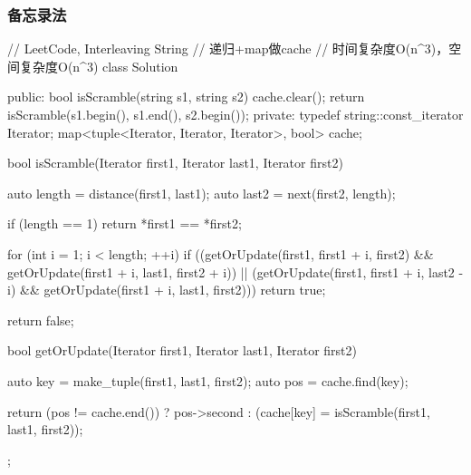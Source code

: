 \subsubsection{备忘录法}
\begin{Code}
// LeetCode, Interleaving String
// 递归+map做cache
// 时间复杂度O(n^3)，空间复杂度O(n^3)
class Solution {
public:
    bool isScramble(string s1, string s2) {
        cache.clear();
        return isScramble(s1.begin(), s1.end(), s2.begin());
    }
private:
    typedef string::const_iterator Iterator;
    map<tuple<Iterator, Iterator, Iterator>, bool> cache;

    bool isScramble(Iterator first1, Iterator last1, Iterator first2) {
        auto length = distance(first1, last1);
        auto last2 = next(first2, length);

        if (length == 1) return *first1 == *first2;

        for (int i = 1; i < length; ++i)
            if ((getOrUpdate(first1, first1 + i, first2)
                    && getOrUpdate(first1 + i, last1, first2 + i))
                    || (getOrUpdate(first1, first1 + i, last2 - i)
                            && getOrUpdate(first1 + i, last1, first2)))
                return true;

        return false;
    }

    bool getOrUpdate(Iterator first1, Iterator last1, Iterator first2) {
        auto key = make_tuple(first1, last1, first2);
        auto pos = cache.find(key);

        return (pos != cache.end()) ?
                pos->second : (cache[key] = isScramble(first1, last1, first2));
    }
};
\end{Code}


